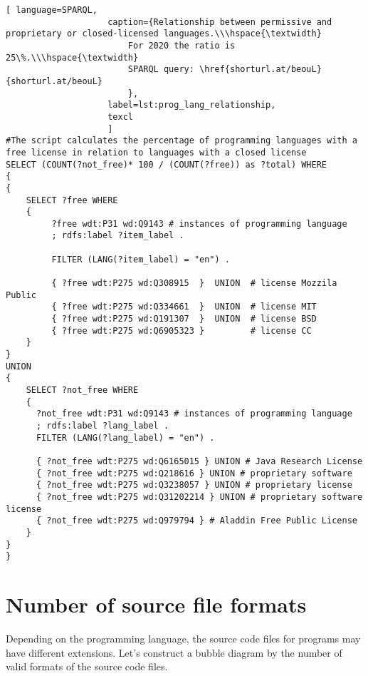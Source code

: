\begin{lstlisting}[ language=SPARQL, 
                    caption={Relationship between permissive and proprietary or closed-licensed languages.\\\hspace{\textwidth}
                        For 2020 the ratio is 25\%.\\\hspace{\textwidth}
                        SPARQL query: \href{shorturl.at/beouL}{shorturl.at/beouL}
                        },
                    label=lst:prog_lang_relationship,
                    texcl 
                    ]
#The script calculates the percentage of programming languages with a free license in relation to languages with a closed license
SELECT (COUNT(?not_free)* 100 / (COUNT(?free)) as ?total) WHERE
{ 
{
    SELECT ?free WHERE 
    {
         ?free wdt:P31 wd:Q9143 # instances of programming language
         ; rdfs:label ?item_label . 

         FILTER (LANG(?item_label) = "en") . 
  
         { ?free wdt:P275 wd:Q308915  }  UNION  # license Mozzila Public
         { ?free wdt:P275 wd:Q334661  }  UNION  # license MIT
         { ?free wdt:P275 wd:Q191307  }  UNION  # license BSD
         { ?free wdt:P275 wd:Q6905323 }         # license CC
    }
}
UNION
{
    SELECT ?not_free WHERE 
    {
      ?not_free wdt:P31 wd:Q9143 # instances of programming language
      ; rdfs:label ?lang_label . 
      FILTER (LANG(?lang_label) = "en") .
  
      { ?not_free wdt:P275 wd:Q6165015 } UNION # Java Research License
      { ?not_free wdt:P275 wd:Q218616 } UNION # proprietary software
      { ?not_free wdt:P275 wd:Q3238057 } UNION # proprietary license 
      { ?not_free wdt:P275 wd:Q31202214 } UNION # proprietary software license 
      { ?not_free wdt:P275 wd:Q979794 } # Aladdin Free Public License
    }
}
}
\end{lstlisting}%

\section{Number of source file formats}

Depending on the programming language, the source code files for programs may have different extensions. Let's construct a bubble diagram by the number of valid formats of the source code files.

